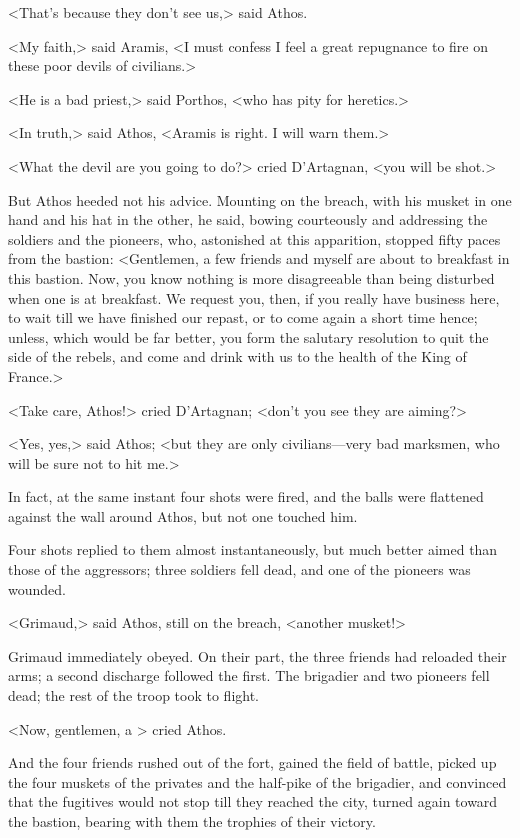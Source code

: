 <That's because they don't see us,> said Athos. 

<My faith,> said Aramis, <I must confess I feel a great repugnance to fire on these poor devils of civilians.> 

<He is a bad priest,> said Porthos, <who has pity for heretics.> 

<In truth,> said Athos, <Aramis is right. I will warn them.> 

<What the devil are you going to do?> cried D'Artagnan, <you will be shot.> 

But Athos heeded not his advice. Mounting on the breach, with his musket in one hand and his hat in the other, he said, bowing courteously and addressing the soldiers and the pioneers, who, astonished at this apparition, stopped fifty paces from the bastion: <Gentlemen, a few friends and myself are about to breakfast in this bastion. Now, you know nothing is more disagreeable than being disturbed when one is at breakfast. We request you, then, if you really have business here, to wait till we have finished our repast, or to come again a short time hence; unless, which would be far better, you form the salutary resolution to quit the side of the rebels, and come and drink with us to the health of the King of France.> 

<Take care, Athos!> cried D'Artagnan; <don't you see they are aiming?> 

<Yes, yes,> said Athos; <but they are only civilians—very bad marksmen, who will be sure not to hit me.> 

In fact, at the same instant four shots were fired, and the balls were flattened against the wall around Athos, but not one touched him. 

Four shots replied to them almost instantaneously, but much better aimed than those of the aggressors; three soldiers fell dead, and one of the pioneers was wounded. 

<Grimaud,> said Athos, still on the breach, <another musket!> 

Grimaud immediately obeyed. On their part, the three friends had reloaded their arms; a second discharge followed the first. The brigadier and two pioneers fell dead; the rest of the troop took to flight. 

<Now, gentlemen, a > cried Athos. 

And the four friends rushed out of the fort, gained the field of battle, picked up the four muskets of the privates and the half-pike of the brigadier, and convinced that the fugitives would not stop till they reached the city, turned again toward the bastion, bearing with them the trophies of their victory. 

